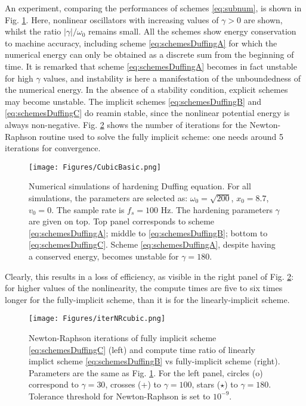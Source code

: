 \documentclass[11pt,twoside,a4paper,english]{book}
\begin{document}
An experiment, comparing the performances of schemes \eqref{eq:subnum}, is shown in Fig. \ref{fig:CubicBasic}. Here, nonlinear oscillators with increasing values of $\gamma > 0$ are shown, whilst the ratio $|\gamma|/\omega_0$ remains small. All the schemes show energy conservation to machine accuracy, including scheme \eqref{eq:schemesDuffingA} for which the numerical energy can only be obtained as a discrete sum from the beginning of time. It is remarked that scheme \eqref{eq:schemesDuffingA} becomes in fact unstable for high $\gamma$ values, and instability is here a manifestation of the unboundedness of the numerical energy. In the absence of a stability condition, explicit schemes may become unstable. The implicit schemes \eqref{eq:schemesDuffingB} and \eqref{eq:schemesDuffingC} do reamin stable, since the nonlinear potential energy is always non-negative. Fig. \ref{fig:CubicNR} shows the number of iterations for the Newton-Raphson routine used to solve the fully implicit scheme: one needs around 5 iterations for convergence. 
\begin{figure}
\texttt{[image: Figures/CubicBasic.png]}
\caption{Numerical simulations of hardening Duffing equation. For all simulations, the parameters are selected as: $\omega_0 = \sqrt{200}$, $x_0 = 8.7$, $v_0=0$. The sample rate is $f_s=100$ Hz. The hardening parameters $\gamma$ are given on top. Top panel corresponds to scheme \eqref{eq:schemesDuffingA}; middle to \eqref{eq:schemesDuffingB}; bottom to \eqref{eq:schemesDuffingC}. Scheme \eqref{eq:schemesDuffingA}, despite having a conserved energy, becomes unstable for $\gamma = 180.$}\label{fig:CubicBasic}
\end{figure}
Clearly, this results in a loss of efficiency, as visible in the right panel of Fig. \ref{fig:CubicNR}: for higher values of the nonlinearity, the compute times are five to six times longer for the fully-implicit scheme, than it is for the linearly-implicit scheme. 
\begin{figure}
\texttt{[image: Figures/iterNRcubic.png]}
\caption{Newton-Raphson iterations of fully implicit scheme \eqref{eq:schemesDuffingC} (left) and compute time ratio of linearly implict scheme \eqref{eq:schemesDuffingB} vs fully-implicit scheme (right). Parameters are the same as Fig. \ref{fig:CubicBasic}. For the left panel, circles (o) correspond to $\gamma =30$, crosses (+) to $\gamma = 100$, stars ($\star$) to $\gamma = 180$. Tolerance threshold for Newton-Raphson is set to $10^{-9}$.}\label{fig:CubicNR}
\end{figure}
\end{document}
